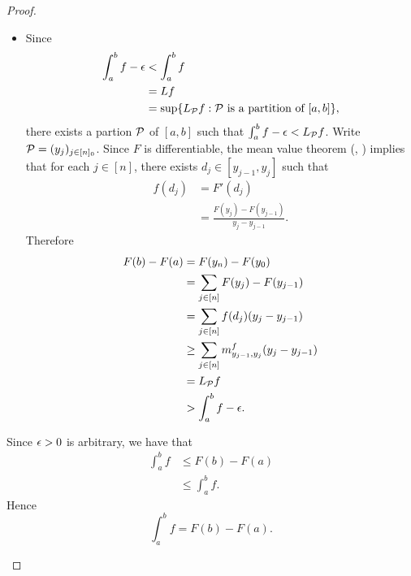 \documentclass{book}
\begin{document}
\begin{proof}
\begin{enumerate}
\begin{itemize}
				there exists a partion $\MP$ of $[a,b]$ such that $U_{\MP}f < 	\int_a^b f + \ep$. Write $\MP = (x_j)_{j \in [n]_0}$. Since $F$ is differentiable, the mean value theorem (\rex{}, ) implies that for each $j \in [n]$, there exists $c_j \in [x_{j-1}, x_j]$ such that 
				\begin{align*}
					f(c_j)
					& = F'(c_j) \\
					& = \frac{F(x_j) - F(x_{j-1})}{x_j - x_{j-1}}.
				\end{align*} 
				Therefore 
				\begin{align*}
					F(b) - F(a)
					& = F(x_n) - F(x_0) \\
					& = \sum\limits_{j \in [n]} F(x_j) - F(x_{j-1}) \\
					& = \sum\limits_{j \in [n]} f(c_j) (x_j - x_{j-1}) \\
					& \leq \sum\limits_{j \in [n]} M^f_{x_{j-1}, x_j} (x_j - x_{j-1}) \\
					& = U_{\MP} f \\
					& < \int_a^b f + \ep.
				\end{align*}
				\item Since  
				\begin{align*}
					\int_a^b f - \epsilon 
					& < \int_a^b f \\
					& = L f \\
					& = \sup \{L_{\mathcal{P}} f: \text{$\mathcal{P}$ is a partition of $[a,b]$}\},
				\end{align*}
				there exists a partion $\MP$ of $[a,b]$ such that $\int_a^b f - \epsilon < L_{\mathcal{P}}f $. Write $\mathcal{P} = (y_j)_{j \in [n]_0}$. Since $F$ is differentiable, the mean value theorem (\rex{}, ) implies that for each $j \in [n]$, there exists $d_j \in [y_{j-1}, y_j]$ such that 
				\begin{align*}
					f(d_j)
					& = F'(d_j) \\
					& = \frac{F(y_j) - F(y_{j-1})}{y_j - y_{j-1}}.
				\end{align*} 
				Therefore 
				\begin{align*}
					F(b) - F(a)
					& = F(y_n) - F(y_0) \\
					& = \sum\limits_{j \in [n]} F(y_j) - F(y_{j-1}) \\
					& = \sum\limits_{j \in [n]} f(d_j) (y_j - y_{j-1}) \\
					& \geq \sum\limits_{j \in [n]} m^f_{y_{j-1}, y_j} (y_j - y_{j-1}) \\
					& = L_{\mathcal{P}} f \\
					& > \int_a^b f - \epsilon.
				\end{align*}
			\end{itemize}
			Since $\epsilon > 0$ is arbitrary, we have that 
			\begin{align*}
				\int_a^b f 
				& \leq F(b) - F(a) \\
				& \leq \int_a^b f.
			\end{align*} 
			Hence
			$$\int_a^b f = F(b) - F(a).$$ 
		\end{enumerate}
	\end{proof}
	
\end{document}
